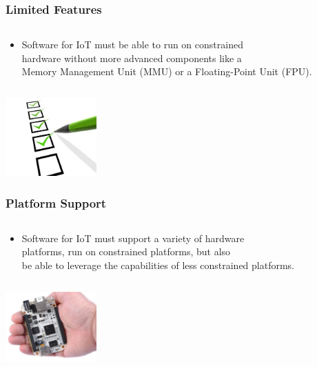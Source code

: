 \documentclass{beamer}
\begin{document}
\begin{frame}
	\frametitle{Limited Features}
	\begin{columns}[c]
		\begin{column}{30cm}
			\vspace{.1cm}
			\begin{itemize}
				\justifying
				\item Software for IoT must be able to run on constrained\\
				hardware without more advanced components like a\\
				Memory Management Unit (MMU) or a Floating-Point Unit (FPU).
			\end{itemize}
		\end{column}
	\end{columns}
	\vspace{1cm}
	\hspace*{7cm} \includegraphics[width=3.5cm]{figs/Features.jpg}
\end{frame}

\begin{frame}
	\frametitle{Platform Support}
	\begin{columns}[c]
		\begin{column}{30cm}
			\vspace{.1cm}
			\begin{itemize}
				\justifying
				\item Software for IoT must support a variety of hardware\\
				platforms, run on constrained platforms, but also\\
				be able to leverage the capabilities of less constrained platforms.
			\end{itemize}
		\end{column}
	\end{columns}
	\vspace{1cm}
	\hspace*{7cm} \includegraphics[width=3.5cm]{figs/hw-platform.jpg}
\end{frame}
\end{document}
